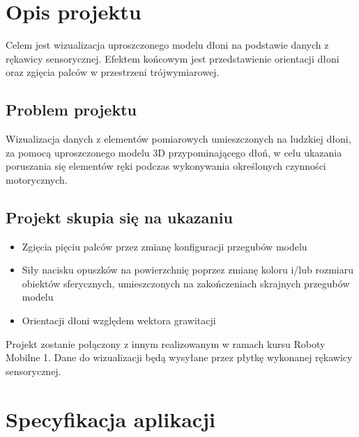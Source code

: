 \documentclass[12pt,a4paper]{article}
\begin{document}
\section{Opis projektu} \normalsize
Celem jest wizualizacja uproszczonego modelu dłoni na podstawie danych z rękawicy sensorycznej. 
Efektem końcowym jest przedstawienie orientacji dłoni oraz zgięcia palców w przestrzeni trójwymiarowej. \\

\subsection{Problem projektu}
Wizualizacja danych z elementów pomiarowych umieszczonych na ludzkiej dłoni, za pomocą uproszczonego modelu 3D przypominającego dłoń, w celu ukazania poruszania się elementów ręki podczas wykonywania określonych czynności motorycznych.

\subsection{Projekt skupia się na ukazaniu}
\begin{itemize}
\item Zgięcia pięciu palców przez zmianę konfiguracji przegubów modelu
\item Siły nacisku opuszków na powierzchnię poprzez zmianę koloru i/lub rozmiaru obiektów sferycznych, umieszczonych na zakończeniach skrajnych przegubów modelu
\item Orientacji dłoni względem wektora grawitacji
\end{itemize}

Projekt zostanie połączony z innym realizowanym w ramach kursu Roboty Mobilne 1. Dane do wizualizacji będą wysyłane przez płytkę wykonanej rękawicy sensorycznej.

\section{Specyfikacja aplikacji}
\end{document}
